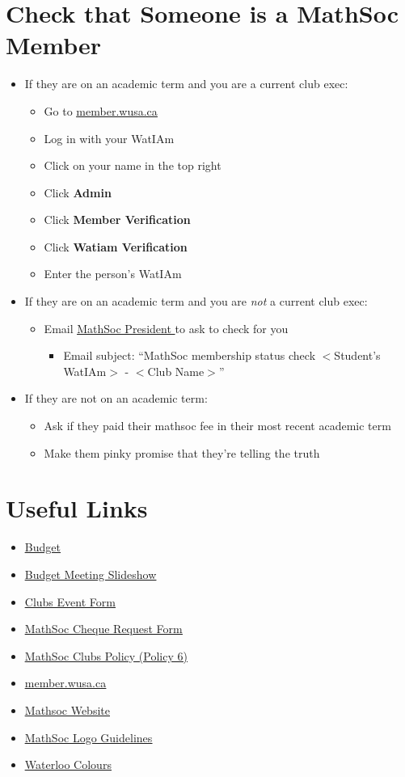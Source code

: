 \documentclass[utf8]{article}
\makeatletter
\newcommand{\budget}{\href{https://drive.google.com/file/d/1uQIh7Qp33NX0TgJhl3DdY-r2HqZzQKuZ/view}{\underline{Budget} }}
\newcommand{\budgetSlideshow}{\href{https://docs.google.com/presentation/d/1STBZmvycCzdxlngaaHDIre7LndTr-057gBXYInwFuVg/edit?usp=sharing}{\underline{Budget Meeting Slideshow} }}
\renewcommand{\labelitemi}{$\square$}
\newcommand{\MathSocPrez}{\href{mailto:prez@mathsoc.uwaterloo.ca}{\underline{MathSoc President} }}
\newcommand{\clubsEventForm}{\href{https://wusa.ca/clubs/clubs-important-forms/clubs-event-form/done?sid=41744&token=1a166c8e45c6113b0322bd3e34fa6fb4}{\underline{Clubs Event Form} }}
\newcommand{\chequeReimbursementForm}{\href{https://mathsoc.uwaterloo.ca/wp-content/uploads/2021/02/Club-Cheque-Request-Form.pdf}{\underline{MathSoc Cheque Request Form} }}
\newcommand{\mathsocClubPolicy}{\href{https://mathsoc.uwaterloo.ca/wp-content/uploads/Mathsoc_Policies-1.pdf}{\underline{MathSoc Clubs Policy (Policy 6)} }}
\newcommand{\membersite}{\href{https://member.wusa.ca/}{\underline{member.wusa.ca} }}
\newcommand{\mathsocsite}{\href{https://mathsoc.uwaterloo.ca/}{\underline{Mathsoc Website} }}
\newcommand{\mathsoclogo}{\href{https://drive.google.com/drive/folders/18v8yaagA74DqMqXaffVm3BGyS8Ze9e5m}{\underline{MathSoc Logo Guidelines} }}
\newcommand{\colorbrand}{\href{https://uwaterloo.ca/brand/how-express-waterloos-brand/colour}{\underline{Waterloo Colours} }}
\makeatother
\begin{document}
\section*{Check that Someone is a MathSoc Member}
\label{sec:membership}
\begin{itemize}
    \item If they are on an academic term and you are a current club exec:
    \begin{itemize}
        \item Go to \membersite
        \item Log in with your WatIAm
        \item Click on your name in the top right
        \item Click \textbf{Admin}
        \item Click \textbf{Member Verification}
        \item Click \textbf{Watiam Verification}
        \item Enter the person's WatIAm 
    \end{itemize}
    \item If they are on an academic term and you are \textit{not} a current club exec:
    \begin{itemize}
        \item Email \MathSocPrez to ask to check for you
        \begin{itemize}
            \item[\textperiodcentered] Email subject: ``MathSoc membership status check $<$Student's WatIAm$>$ - $<$Club Name$>$''
        \end{itemize}
    \end{itemize}
    \item If they are not on an academic term:
    \begin{itemize}
        \item Ask if they paid their mathsoc fee in their most recent academic term
        \item Make them pinky promise that they're telling the truth
    \end{itemize}
\end{itemize}

\renewcommand\labelitemi{\textbullet}
\section*{Useful Links}
\label{sec:otherresources}
\begin{itemize}
    \item \budget
    \item \budgetSlideshow
    \item \clubsEventForm
    \item \chequeReimbursementForm
    \item \mathsocClubPolicy
    \item \membersite
    \item \mathsocsite
    \item \mathsoclogo
    \item \colorbrand
\end{itemize}
\end{document}

